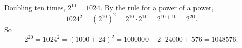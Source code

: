 Doubling ten times, $2^{10}=1024$. By the rule for a power of a power,
\[1024^2=\left(2^{10}\right)^2=2^{10}\cdot2^{10}=2^{10+10}=2^{20}.\]
So
\[2^{20}=1024^2=(1000+24)^2=1000000+2\cdot24000+576=\boxed{1048576}.\]
